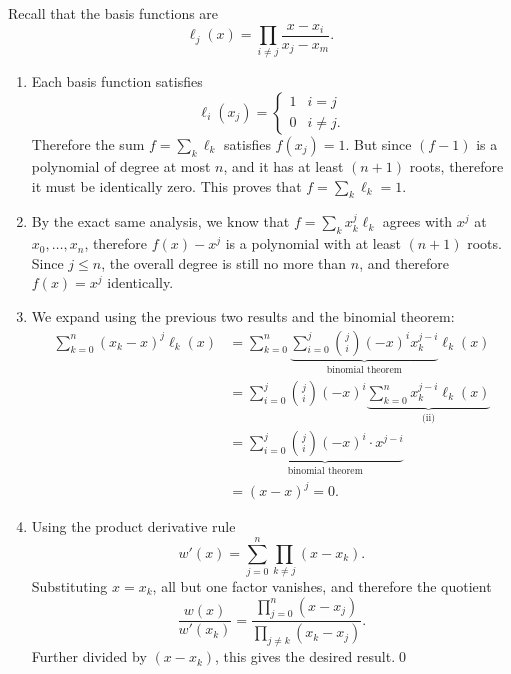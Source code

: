 \documentclass{homework}
\begin{document}
\begin{problem}
Recall that the basis functions are
\[\ell_j(x) = \prod_{i \ne j} \frac{x - x_i}{x_j - x_m}.\]

\begin{enumerate}[label=(\roman*)]
\item Each basis function satisfies
\[\ell_i(x_j) = \begin{cases}
  1 & i = j\\
  0 & i\ne j.
\end{cases}\]
Therefore the sum \(f = \sum_k \ell_k\) satisfies
\(f(x_j) = 1\). But since \((f - 1)\) is a polynomial
of degree at most \(n\), and it has at least
\((n+1)\) roots, therefore it must be
identically zero. This proves that
\(f = \sum_k \ell_k = 1\).

\item By the exact same analysis, we know that
\(f = \sum_k x_k^j \ell_k\) agrees with \(x^j\)
at \(x_0,\dots,x_n\), therefore \(f(x) - x^j\)
is a polynomial with at least \((n+1)\) roots.
Since \(j \le n\), the overall degree is still
no more than \(n\), and therefore \(f(x) = x^j\)
identically.

\item We expand using the previous two results
and the binomial theorem:
\[\begin{aligned}
\sum_{k=0}^n (x_k - x)^j \ell_k(x)
&= \sum_{k=0}^n \underbrace{\sum_{i = 0}^j
  \binom{j}{i} (-x)^i x_k^{j-i}}_{\text{binomial theorem}} \ell_k(x)\\
&= \sum_{i = 0}^j \binom{j}{i} (-x)^i
  \underbrace{\sum_{k=0}^n x_k^{j-i} \ell_k(x)}_{\text{(ii)}}\\
&= \underbrace{\sum_{i = 0}^j \binom{j}{i} (-x)^i \cdot x^{j-i}}_{\text{binomial theorem}}\\
&= (x - x)^j = 0.
\end{aligned}\]

\item Using the product derivative rule
\[w'(x) = \sum_{j = 0}^n
\prod_{k \ne j} (x - x_k).\]
Substituting \(x = x_k\), all but one factor vanishes,
and therefore the quotient
\[\frac{w(x)}{w'(x_k)}
= \frac{\prod_{j=0}^n (x - x_j)}{\prod_{j\ne k} (x_k - x_j)}.\]
Further divided by \((x - x_k)\), this gives
the desired result.\qed
\end{enumerate}
\renewcommand{\qed}{}
\end{problem}
\end{document}
